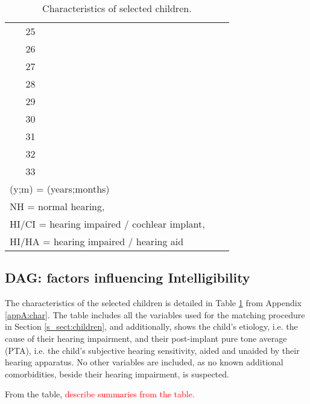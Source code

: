 \begin{table}[h!]
\begin{tabular}{| c | cccccccc |}
		25 &  &  &  &  &  &  &  &\\
		\rowcolor{gray}
		26 &  &  &  &  &  &  &  &\\
		27 &  &  &  &  &  &  &  &\\
		\rowcolor{gray}
		28 &  &  &  &  &  &  &  &\\
		29 &  &  &  &  &  &  &  &\\
		\rowcolor{gray}
		30 &  &  &  &  &  &  &  &\\
		31 &  &  &  &  &  &  &  &\\ 
		\rowcolor{gray}
		32 &  &  &  &  &  &  &  &\\ 
		33 &  &  &  &  &  &  &  &\\
		\hline
		\multicolumn{7}{l}{\footnotesize{(y;m) = (years;months)}} \\
		\multicolumn{7}{l}{\footnotesize{NH = normal hearing,}} \\
		\multicolumn{7}{l}{\footnotesize{HI/CI = hearing impaired / cochlear implant,}} \\
		\multicolumn{7}{l}{\footnotesize{HI/HA = hearing impaired / hearing aid}}
	\end{tabular}
	\caption{Characteristics of selected children.}
	\label{tab:children_char}
\end{table}


\subsection{DAG: factors influencing Intelligibility}
%
The characteristics of the selected children is detailed in Table \ref{tab:children_char} from Appendix \ref{appA:char}. The table includes all the variables used for the matching procedure in Section \ref{s_sect:children}, and additionally, shows the child's etiology, i.e. the cause of their hearing impairment, and their post-implant pure tone average (PTA), i.e. the child's subjective hearing sensitivity, aided and unaided by their hearing apparatus. No other variables are included, as no known additional comorbidities, beside their hearing impairment, is suspected.

From the table, \textcolor{red}{describe summaries from the table.}


